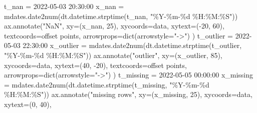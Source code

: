 \documentclass[
  letterpaper,
  DIV=11,
  numbers=noendperiod,
  oneside]{scrreprt}
\newenvironment{Shaded}{\begin{snugshade}}{\end{snugshade}}
\newcommand{\BuiltInTok}[1]{\textcolor[rgb]{0.00,0.23,0.31}{#1}}
\newcommand{\DecValTok}[1]{\textcolor[rgb]{0.68,0.00,0.00}{#1}}
\newcommand{\NormalTok}[1]{\textcolor[rgb]{0.00,0.23,0.31}{#1}}
\newcommand{\OperatorTok}[1]{\textcolor[rgb]{0.37,0.37,0.37}{#1}}
\newcommand{\SpecialCharTok}[1]{\textcolor[rgb]{0.37,0.37,0.37}{#1}}
\newcommand{\StringTok}[1]{\textcolor[rgb]{0.13,0.47,0.30}{#1}}
\begin{document}
\begin{Shaded}
\begin{Highlighting}[]
\NormalTok{t\_nan }\OperatorTok{=} \StringTok{\textquotesingle{}2022{-}05{-}03 20:30:00\textquotesingle{}}
\NormalTok{x\_nan }\OperatorTok{=}\NormalTok{ mdates.date2num(dt.datetime.strptime(t\_nan, }\StringTok{"\%Y{-}\%m{-}}\SpecialCharTok{\%d}\StringTok{ \%H:\%M:\%S"}\NormalTok{))}
\NormalTok{ax.annotate(}\StringTok{"NaN"}\NormalTok{,}
\NormalTok{            xy}\OperatorTok{=}\NormalTok{(x\_nan, }\DecValTok{25}\NormalTok{),}
\NormalTok{            xycoords}\OperatorTok{=}\StringTok{\textquotesingle{}data\textquotesingle{}}\NormalTok{,}
\NormalTok{            xytext}\OperatorTok{=}\NormalTok{(}\OperatorTok{{-}}\DecValTok{20}\NormalTok{, }\DecValTok{60}\NormalTok{),}
\NormalTok{            textcoords}\OperatorTok{=}\StringTok{\textquotesingle{}offset points\textquotesingle{}}\NormalTok{,}
\NormalTok{            arrowprops}\OperatorTok{=}\BuiltInTok{dict}\NormalTok{(arrowstyle}\OperatorTok{=}\StringTok{"{-}\textgreater{}"}\NormalTok{)}
\NormalTok{           )}
\NormalTok{t\_outlier }\OperatorTok{=} \StringTok{\textquotesingle{}2022{-}05{-}03 22:30:00\textquotesingle{}}
\NormalTok{x\_outlier }\OperatorTok{=}\NormalTok{ mdates.date2num(dt.datetime.strptime(t\_outlier, }\StringTok{"\%Y{-}\%m{-}}\SpecialCharTok{\%d}\StringTok{ \%H:\%M:\%S"}\NormalTok{))}
\NormalTok{ax.annotate(}\StringTok{"outlier"}\NormalTok{,}
\NormalTok{            xy}\OperatorTok{=}\NormalTok{(x\_outlier, }\DecValTok{85}\NormalTok{),}
\NormalTok{            xycoords}\OperatorTok{=}\StringTok{\textquotesingle{}data\textquotesingle{}}\NormalTok{,}
\NormalTok{            xytext}\OperatorTok{=}\NormalTok{(}\DecValTok{40}\NormalTok{, }\OperatorTok{{-}}\DecValTok{20}\NormalTok{),}
\NormalTok{            textcoords}\OperatorTok{=}\StringTok{\textquotesingle{}offset points\textquotesingle{}}\NormalTok{,}
\NormalTok{            arrowprops}\OperatorTok{=}\BuiltInTok{dict}\NormalTok{(arrowstyle}\OperatorTok{=}\StringTok{"{-}\textgreater{}"}\NormalTok{)}
\NormalTok{           )}
\NormalTok{t\_missing }\OperatorTok{=} \StringTok{\textquotesingle{}2022{-}05{-}05 00:00:00\textquotesingle{}}
\NormalTok{x\_missing }\OperatorTok{=}\NormalTok{ mdates.date2num(dt.datetime.strptime(t\_missing, }\StringTok{"\%Y{-}\%m{-}}\SpecialCharTok{\%d}\StringTok{ \%H:\%M:\%S"}\NormalTok{))}
\NormalTok{ax.annotate(}\StringTok{"missing rows"}\NormalTok{,}
\NormalTok{            xy}\OperatorTok{=}\NormalTok{(x\_missing, }\DecValTok{25}\NormalTok{),}
\NormalTok{            xycoords}\OperatorTok{=}\StringTok{\textquotesingle{}data\textquotesingle{}}\NormalTok{,}
\NormalTok{            xytext}\OperatorTok{=}\NormalTok{(}\DecValTok{0}\NormalTok{, }\DecValTok{40}\NormalTok{),}

\end{Highlighting}
\end{Shaded}
\end{document}

